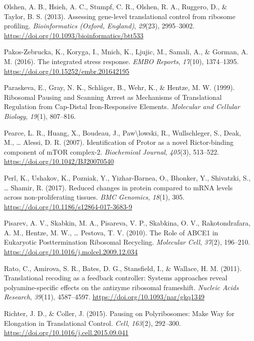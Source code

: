 \documentclass[12pt,openany]{book}
\begin{document}
\hypertarget{ref-Olshen2013}{}
Olshen, A. B., Hsieh, A. C., Stumpf, C. R., Olshen, R. A., Ruggero, D.,
\& Taylor, B. S. (2013). Assessing gene-level translational control from
ribosome profiling. \emph{Bioinformatics (Oxford, England)},
\emph{29}(23), 2995--3002.
\url{https://doi.org/10.1093/bioinformatics/btt533}

\hypertarget{ref-Pakos-Zebrucka2016}{}
Pakos-Zebrucka, K., Koryga, I., Mnich, K., Ljujic, M., Samali, A., \&
Gorman, A. M. (2016). The integrated stress response. \emph{EMBO
Reports}, \emph{17}(10), 1374--1395.
\url{https://doi.org/10.15252/embr.201642195}

\hypertarget{ref-Paraskeva1999}{}
Paraskeva, E., Gray, N. K., Schläger, B., Wehr, K., \& Hentze, M. W.
(1999). Ribosomal Pausing and Scanning Arrest as Mechanisms of
Translational Regulation from Cap-Distal Iron-Responsive Elements.
\emph{Molecular and Cellular Biology}, \emph{19}(1), 807--816.

\hypertarget{ref-Pearce2007}{}
Pearce, L. R., Huang, X., Boudeau, J., Paw\textbackslash{}lowski, R.,
Wullschleger, S., Deak, M., \ldots{} Alessi, D. R. (2007).
Identification of Protor as a novel Rictor-binding component of mTOR
complex-2. \emph{Biochemical Journal}, \emph{405}(3), 513--522.
\url{https://doi.org/10.1042/BJ20070540}

\hypertarget{ref-Perl2017}{}
Perl, K., Ushakov, K., Pozniak, Y., Yizhar-Barnea, O., Bhonker, Y.,
Shivatzki, S., \ldots{} Shamir, R. (2017). Reduced changes in protein
compared to mRNA levels across non-proliferating tissues. \emph{BMC
Genomics}, \emph{18}(1), 305.
\url{https://doi.org/10.1186/s12864-017-3683-9}

\hypertarget{ref-Pisarev2010}{}
Pisarev, A. V., Skabkin, M. A., Pisareva, V. P., Skabkina, O. V.,
Rakotondrafara, A. M., Hentze, M. W., \ldots{} Pestova, T. V. (2010).
The Role of ABCE1 in Eukaryotic Posttermination Ribosomal Recycling.
\emph{Molecular Cell}, \emph{37}(2), 196--210.
\url{https://doi.org/10.1016/j.molcel.2009.12.034}

\hypertarget{ref-Rato2011}{}
Rato, C., Amirova, S. R., Bates, D. G., Stansfield, I., \& Wallace, H.
M. (2011). Translational recoding as a feedback controller: Systems
approaches reveal polyamine-specific effects on the antizyme ribosomal
frameshift. \emph{Nucleic Acids Research}, \emph{39}(11), 4587--4597.
\url{https://doi.org/10.1093/nar/gkq1349}

\hypertarget{ref-Richter2015}{}
Richter, J. D., \& Coller, J. (2015). Pausing on Polyribosomes: Make Way
for Elongation in Translational Control. \emph{Cell}, \emph{163}(2),
292--300. \url{https://doi.org/10.1016/j.cell.2015.09.041}
\end{document}
